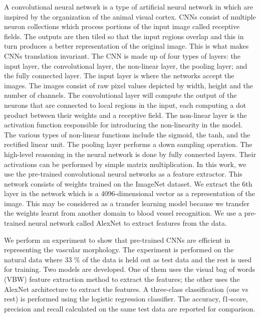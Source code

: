 A convolutional neural network is a type of artificial neural network in which are inspired by the organization of the 
animal visual cortex. CNNs consist of multiple neuron collections which process portions of the input image called receptive fields. The outputs are then tiled so that the input regions overlap and this in turn produces a better representation of the original image. This is what makes CNNs translation invariant. 
The CNN is made up of four types of layers: the input layer, the convolutional layer, the non-linear layer, the pooling layer; and the fully connected layer. The input layer is where the networks accept the images.  The images consist of raw pixel values depicted by width, height and the number of channels.  The convolutional layer will compute the output of the neurons that are connected to local regions in the input, each computing a dot product between their weights and a receptive field. The non-linear layer is the activation function responsible for introducing the non-linearity in the model. The various types of non-linear functions include the sigmoid, the tanh, and the rectified linear unit. The pooling layer performs a down sampling operation. The high-level reasoning in the neural network is done by fully connected layers.  Their activations can be performed by simple matrix multiplication.
In this work, we use the pre-trained convolutional neural networks as a feature extractor. This network consists of weights trained on the ImageNet dataset. We extract the 6th layer in the network which is a 4096-dimensional vector as a representation of the image. This may be considered as a transfer learning model because we transfer the weights learnt from another domain to blood vessel recognition. We use a pre-trained neural network called AlexNet \cite{krizhevsky2012imagenet} to extract features from the data. 

We perform an experiment to show that pre-trained CNNs are efficient in representing the vascular morphology. The experiment is performed on the natural data where 33 \% of the data is held out as test data and the rest is used for training. Two models are developed. One of them uses the visual bag of words (VBW) \cite{yang2007evaluating} feature extraction method to extract the features; the other uses the AlexNet architecture to extract the features. A three-class classification (one vs rest) is performed using the logistic regression classifier. The accuracy, f1-score, precision and recall calculated on the same test data are reported for comparison.

